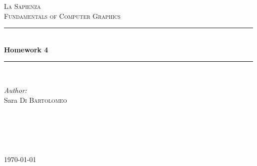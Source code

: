 \documentclass[12pt]{article} %
\begin{document}

\begin{titlepage}

\newcommand{\HRule}{\rule{\linewidth}{0.5mm}} %

\center %

\textsc{\LARGE La Sapienza}\\[1.5cm] %
\textsc{\Large Fundamentals of Computer Graphics}\\[0.5cm] %

\HRule \\[0.4cm]
{ \huge \bfseries Homework 4}\\[0.4cm] %
\HRule \\[1.5cm]

\begin{minipage}{0.4\textwidth}
\begin{flushleft} \large
\emph{Author:}\\
Sara \textsc{Di Bartolomeo} %
\end{flushleft}
\end{minipage}
~
\begin{minipage}{0.4\textwidth}
\begin{flushright} \large
\emph{} \\
 \textsc{} %
\end{flushright}
\end{minipage}\\[4cm]

{\large \today}\\[3cm] %


\vfill %

\end{titlepage}


\end{document}
